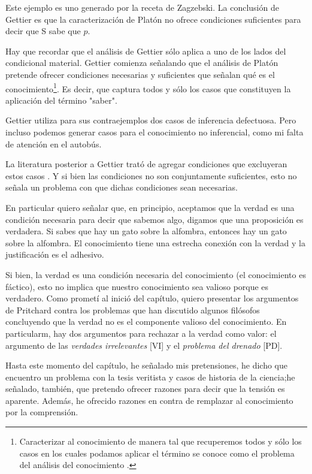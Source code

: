 Este ejemplo es uno generado por la receta de Zagzebski.
La conclusión de Gettier es que la caracterización de Platón no ofrece condiciones suficientes para decir que S sabe que $p$.

Hay que recordar que el análisis de Gettier sólo aplica a uno de los lados del condicional material.
Gettier comienza señalando que el análisis de Platón pretende ofrecer condiciones necesarias y suficientes que señalan qué es el conocimiento\footnote{Caracterizar al conocimiento de manera tal que recuperemos todos y sólo los casos en los cuales podamos aplicar el término se conoce como el problema del análisis del conocimiento \parencite{ichikawa2018}.}.
Es decir, que captura todos y sólo los casos que constituyen la aplicación del término "saber".

Gettier utiliza para sus contraejemplos dos casos de inferencia defectuosa.
Pero incluso podemos generar casos para el conocimiento no inferencial, como mi falta de atención en el autobús.

La literatura posterior a Gettier trató de agregar condiciones que excluyeran  estos casos \parencite{zagzebski1994}.
Y si bien las condiciones no son conjuntamente suficientes, esto no señala un problema con que dichas condiciones sean necesarias.

En particular quiero señalar que, en principio, aceptamos que la verdad es una condición necesaria para decir que sabemos algo, digamos que una proposición es verdadera.
Si sabes que hay un gato sobre la alfombra, entonces hay un gato sobre la alfombra.
El conocimiento tiene una estrecha conexión con la verdad y la justificación es el adhesivo.

Si bien, la verdad es una condición necesaria del conocimiento (el conocimiento es fáctico), esto no implica que nuestro conocimiento sea valioso porque es verdadero.
Como prometí al inició del capítulo, quiero presentar los argumentos de Pritchard contra los problemas que han discutido algunos filósofos concluyendo que la verdad no es el componente valioso del conocimiento.
En particularm, hay dos argumentos para rechazar a la verdad como valor: el argumento de las \emph{verdades irrelevantes} [VI] y el \emph{problema del drenado} [PD].

Hasta este momento del capítulo, he señalado mis pretensiones, he dicho que encuentro un problema con la tesis veritista y casos de historia de la ciencia;he señalado, también, que pretendo ofrecer razones para decir que la tensión es aparente.
Además, he ofrecido razones en contra de remplazar al conocimiento por la comprensión.

